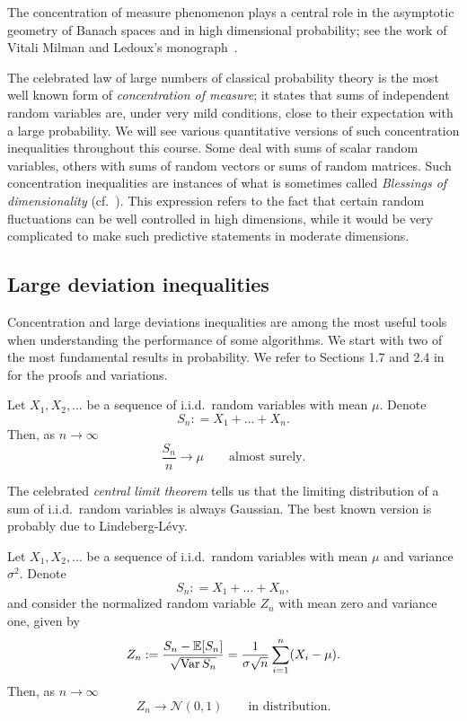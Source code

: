 The  concentration  of  measure  phenomenon plays a central role in the asymptotic geometry of Banach spaces and in high dimensional probability; see the work of Vitali Milman and Ledoux's monograph~\cite{milman1986asymptotic,ledoux2001concentration}.

The celebrated law of large numbers of classical probability theory is the most well known form
of {\em concentration of measure}; it states that sums of independent random variables are,
under very mild conditions, close to their expectation with a large probability. We will see
various quantitative versions of such concentration inequalities throughout this course. Some
deal with sums of scalar random variables, others with sums of random vectors or sums of
random matrices.
Such concentration inequalities are instances of what is sometimes called {\em Blessings of dimensionality} (cf.~\cite{donoho2000high}). This expression refers to the fact that certain random fluctuations can be well
controlled in high dimensions, while it would be very complicated to make such predictive
statements in moderate dimensions.


\subsection{Large deviation inequalities}\label{s:largedeviations}


Concentration and large deviations inequalities are among the most useful tools when understanding the performance of some algorithms.
We start with two of the most fundamental results in probability. We refer to Sections 1.7 and 2.4 in~\cite{durrett2019probability} for the proofs and variations.

\begin{theorem} \label{th:stronglaw}
Let $X_1,X_2,\dots $ be a sequence of i.i.d.\ random variables with mean $\mu$. Denote
$$S_n: = X_1+\dots + X_n.$$
Then, as $n \to \infty$
\begin{equation}
\frac{S_n}{n} \to \mu \qquad \text{almost surely}.
\end{equation}
\end{theorem}

The celebrated {\em central limit theorem} tells us that the limiting distribution of a sum of i.i.d.\ random variables is always Gaussian.
The best known version is probably due to Lindeberg-L\'{e}vy.

\begin{theorem} \label{th:centrallimit}
Let $X_1,X_2,\dots $ be a sequence of i.i.d.\ random variables with mean $\mu$ and variance $\sigma^2$. Denote
$$S_n: = X_1+\dots + X_n,$$
and consider the normalized random variable $Z_n$ with mean zero and variance one, given by
$$
Z_n: = \frac{ S_n - \mathbb{E} [S_n] }{ \sqrt{\operatorname{Var}{S_n}} } = \frac{1}{\sigma\sqrt{n}} \sum_{i=1}^n (X_i - \mu).
$$
Then, as $n \to \infty$
\begin{equation}
Z_n \to {\mathcal N}(0,1) \qquad \text{in distribution}.
\end{equation}
\end{theorem}

